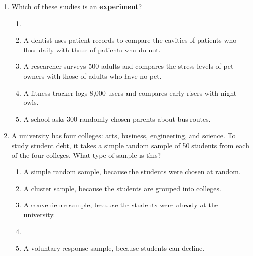 \documentclass[12pt]{article}
\begin{document}
\begin{enumerate}[leftmargin=1.9em, itemsep=0.13in]
  \boxguard[14]
  \item Which of these studies is an \textbf{experiment}?
        \begin{enumerate}[label=\textbf{(\Alph*)}, leftmargin=2.2em, itemsep=2pt]
          \item {}
          \item A dentist uses patient records to compare the cavities of patients who floss
                daily with those of patients who do not.
          \item A researcher surveys 500 adults and compares the stress levels of pet owners
                with those of adults who have no pet.
          \item A fitness tracker logs 8{,}000 users and compares early risers with night owls.
          \item A school asks 300 randomly chosen parents about bus routes.\hfill{}\rule[-0.2in]{0pt}{0.48in}
        \end{enumerate}

  \boxguard[13]
  \item A university has four colleges: arts, business, engineering, and science. To study
        student debt, it takes a simple random sample of 50 students from each of the four
        colleges. What type of sample is this?
        \begin{enumerate}[label=\textbf{(\Alph*)}, leftmargin=2.2em, itemsep=2pt]
          \item A simple random sample, because the students were chosen at random.
          \item A cluster sample, because the students are grouped into colleges.
          \item A convenience sample, because the students were already at the university.
          \item {}\\
          \item A voluntary response sample, because students can decline.\hfill{}\rule[-0.2in]{0pt}{0.48in}
        \end{enumerate}


\end{enumerate}
\end{document}
